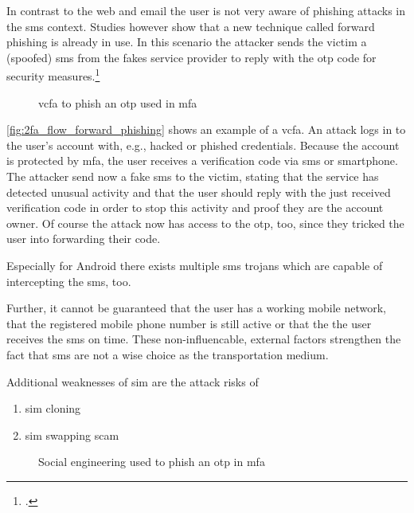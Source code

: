 In contrast to the web and email the user is not very aware of phishing attacks in the \gls{sms} context. Studies however show that a new technique called forward phishing is already in use. In this scenario the attacker sends the victim a (spoofed) \gls{sms} from the fakes service provider to reply with the \gls{otp} code for security measures.\footcite{JAKOBSSON20186,SIADATI201714}

\begin{figure}[hbt]
	\centering
	
	\caption[\gls{vcfa} to phish an \gls{otp} used in \gls{mfa}]{\gls{vcfa} to phish an \gls{otp} used in \gls{mfa}\footnotemark}
	\label{fig:2fa_flow_forward_phishing}
\end{figure}

\autoref{fig:2fa_flow_forward_phishing} shows an example of a \gls{vcfa}. An attack logs in to the user's account with, e.g., hacked or phished credentials. Because the account is protected by \gls{mfa}, the user receives a verification code via \gls{sms} or smartphone. The attacker send now a fake \gls{sms} to the victim, stating that the service has detected unusual activity and that the user should reply with the just received verification code in order to stop this activity and proof they are the account owner. Of course the attack now has access to the \gls{otp}, too, since they tricked the user into forwarding their code.

Especially for Android there exists multiple \gls{sms} trojans which are capable of intercepting the \gls{sms}, too.

Further, it cannot be guaranteed that the user has a working mobile network, that the registered mobile phone number is still active or that the the user receives the \gls{sms} on time. These non-influencable, external factors strengthen the fact that \gls{sms} are not a wise choice as the transportation medium.

Additional weaknesses of \gls{sim} are the attack risks of 

\begin{enumerate}[label=(\alph*)]
	\item \gls{sim} cloning
	\item \gls{sim} swapping scam
\end{enumerate}

\begin{figure}[hbt]
	\centering
	
	\caption[Social engineering used to phish an \gls{otp} in \gls{mfa}]{Social engineering used to phish an \gls{otp} in \gls{mfa}\footnotemark}
	\label{fig:2fa_flow_sim_hack}
\end{figure}

